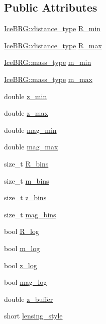 \subsection*{Public Attributes}
\begin{DoxyCompactItemize}
\item 
\hyperlink{namespaceIceBRG_a45499647eb87e24c10ab32c628711cec}{Ice\+B\+R\+G\+::distance\+\_\+type} \hyperlink{structcorr__func__config_a96d6144c4e505099c1cfe7a684bc04fe}{R\+\_\+min}
\item 
\hyperlink{namespaceIceBRG_a45499647eb87e24c10ab32c628711cec}{Ice\+B\+R\+G\+::distance\+\_\+type} \hyperlink{structcorr__func__config_aff81b65fcb8bd33994e15cc6e9f055e6}{R\+\_\+max}
\item 
\hyperlink{namespaceIceBRG_a1be72ac4918a9b029f2eefa084213e35}{Ice\+B\+R\+G\+::mass\+\_\+type} \hyperlink{structcorr__func__config_a1024dce359a71584b457e9336d8b582e}{m\+\_\+min}
\item 
\hyperlink{namespaceIceBRG_a1be72ac4918a9b029f2eefa084213e35}{Ice\+B\+R\+G\+::mass\+\_\+type} \hyperlink{structcorr__func__config_ab08f8d621b4511265b819a1596534310}{m\+\_\+max}
\item 
double \hyperlink{structcorr__func__config_a5ec34a08df3a75740e1c5d39a76a6071}{z\+\_\+min}
\item 
double \hyperlink{structcorr__func__config_aa80df2d7d3aed8c418992ff4648808b6}{z\+\_\+max}
\item 
double \hyperlink{structcorr__func__config_a8ba7b184c01024561a77311ee8cab8f2}{mag\+\_\+min}
\item 
double \hyperlink{structcorr__func__config_a0868149e3bf677097272d0138deda3bb}{mag\+\_\+max}
\item 
size\+\_\+t \hyperlink{structcorr__func__config_af53ff82362ef469976b178d875d0b669}{R\+\_\+bins}
\item 
size\+\_\+t \hyperlink{structcorr__func__config_a0a0f61ffece04838e70e7db635dd214d}{m\+\_\+bins}
\item 
size\+\_\+t \hyperlink{structcorr__func__config_ae9f3db83bee5cac291da7de89bdd6297}{z\+\_\+bins}
\item 
size\+\_\+t \hyperlink{structcorr__func__config_a6bc5de4237d8756c11b86645c6ef66a7}{mag\+\_\+bins}
\item 
bool \hyperlink{structcorr__func__config_a269de7bc2b6288df975786b443001700}{R\+\_\+log}
\item 
bool \hyperlink{structcorr__func__config_a3666c660142e59a9811d5c6dc2cf6da4}{m\+\_\+log}
\item 
bool \hyperlink{structcorr__func__config_a5204dc51747bc18ada4f2c9e26e2ae22}{z\+\_\+log}
\item 
bool \hyperlink{structcorr__func__config_a961d18f857407c0475a0c9ccb5b96455}{mag\+\_\+log}
\item 
double \hyperlink{structcorr__func__config_a17340f8a3eaea4875259c98beb8fec7a}{z\+\_\+buffer}
\item 
short \hyperlink{structcorr__func__config_a8672d6954054bf86f366785aef5a5ea8}{lensing\+\_\+style}
\end{DoxyCompactItemize}
